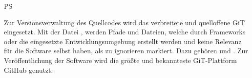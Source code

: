 \hfill %
\begin{minipage}[t]{.375\textwidth}
    \vspace{-.5em}
    \captionsetup{labelsep=newline,format=plain,justification=centering}
    \label{fig:projekt-struktur-architektur}
    \vspace{.25em}
\end{minipage}
\begin{enumerateWithCode}{PS}
    \setcounter{enumi}{7}

    \item Zur Versionsverwaltung des Quellcodes wird das verbreitete und quelloffene GiT eingesetzt.
    Mit der Datei , werden Pfade und Dateien, welche \zB durch Frameworks oder die eingesetzte Entwicklungsumgebung erstellt werden und keine Relevanz für die Software selbst haben, als zu ignorieren markiert.
    Dazu gehören  und .
    Zur Veröffentlichung der Software wird die größte und bekannteste GiT-Plattform GitHub genutzt.
\end{enumerateWithCode}
